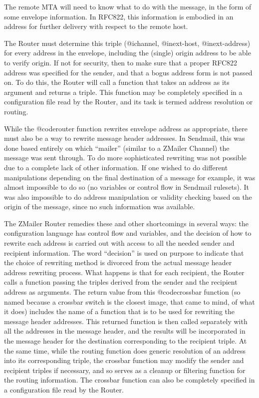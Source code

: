 {The remote MTA will need to know what to do with the message, in
the form of some envelope information.
In RFC822, this information is embodied in an address for further
delivery with respect to the remote host.

The Router must determine this triple (@i{channel}, @i{next-host},
@i{next-address}) for every address in the envelope, including the
(single) origin address to be able to verify origin.
If not for security, then to make sure that a proper RFC822 address
was specified for the sender, and that a bogus address form is not
passed on.
To do this, the Router will call a function that takes an address as
its argument and returns a triple.
This function may be completely specified in a configuration file read
by the Router, and its task is termed address resolution or routing.

While the @code{router} function rewrites envelope address as appropriate,
there must also be a way to rewrite message header addresses.
In Sendmail, this was done based entirely on which ``mailer''
(similar to a ZMailer Channel) the message was sent through.
To do more sophisticated rewriting was not possible due to a complete
lack of other information.
If one wished to do different manipulations depending on the final
destination of a message for example, it was almost impossible to do so
(no variables or control flow in Sendmail rulesets).
It was also impossible to do address manipulation or validity checking
based on the origin of the message, since no such information was available.

The ZMailer Router remedies these and other shortcomings in several ways:
the configuration language has control flow and variables, and the decision
of how to rewrite each address is carried out with access to all the needed
sender and recipient information.
The word ``decision'' is used on purpose to indicate that the choice
of rewriting method is divorced from the actual message header address
rewriting process.
What happens is that for each recipient, the Router calls a function
passing the triples derived from the sender and the recipient address
as arguments.
The return value from this @code{crossbar} function (so named because
a crossbar switch is the closest image, that came to mind, of what it
does) includes the name of a function that is to be used for rewriting
the message header addresses.
This returned function is then called separately with all the addresses
in the message header, and the results will be incorporated in the message
header for the destination corresponding to the recipient triple.
At the same time, while the routing function does generic resolution of
an address into its corresponding triple, the crossbar function may modify
the sender and recipient triples if necessary, and so serves as a cleanup
or filtering function for the routing information.
The crossbar function can also be completely specified in a configuration
file read by the Router.

}
